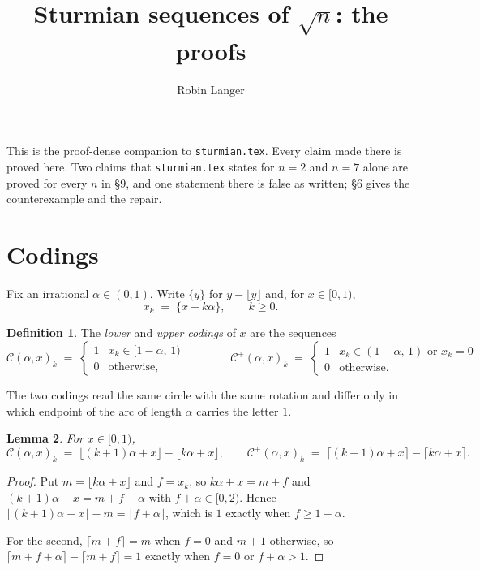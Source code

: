 \documentclass[11pt,a4paper]{article}
\title{Sturmian sequences of $\sqrt n$: the proofs}
\author{Robin Langer}
\date{}
\newcommand{\C}{\mathcal{C}}
\newcommand{\Cp}{\mathcal{C}^{+}}
\theoremstyle{definition}
\newtheorem{definition}{Definition}
\theoremstyle{plain}
\newtheorem{lemma}[definition]{Lemma}
\begin{document}
\maketitle
\vspace{-2em}

This is the proof-dense companion to \texttt{sturmian.tex}. Every claim made
there is proved here. Two claims that \texttt{sturmian.tex} states for
$n = 2$ and $n = 7$ alone are proved for every $n$ in \S9, and one statement
there is false as written; \S6 gives the counterexample and the repair.

\section{Codings}

Fix an irrational $\alpha \in (0,1)$. Write $\{y\}$ for $y - \lfloor y \rfloor$
and, for $x \in [0,1)$,
\[
  x_k \;=\; \{x + k\alpha\} , \qquad k \geq 0 .
\]

\begin{definition}
The \emph{lower} and \emph{upper codings} of $x$ are the sequences
\[
  \C(\alpha,x)_k \;=\;
  \begin{cases} 1 & x_k \in [1-\alpha,\,1) \\ 0 & \text{otherwise,}\end{cases}
  \qquad\qquad
  \Cp(\alpha,x)_k \;=\;
  \begin{cases} 1 & x_k \in (1-\alpha,\,1) \text{ or } x_k = 0 \\ 0 & \text{otherwise.}\end{cases}
\]
\end{definition}

The two codings read the same circle with the same rotation and differ only in
which endpoint of the arc of length $\alpha$ carries the letter $1$.

\begin{lemma}\label{lem:mech}
For $x \in [0,1)$,
\[
  \C(\alpha,x)_k \;=\; \lfloor (k+1)\alpha + x \rfloor - \lfloor k\alpha + x \rfloor ,
  \qquad
  \Cp(\alpha,x)_k \;=\; \lceil (k+1)\alpha + x \rceil - \lceil k\alpha + x \rceil .
\]
\end{lemma}

\begin{proof}
Put $m = \lfloor k\alpha + x\rfloor$ and $f = x_k$, so $k\alpha + x = m + f$ and
$(k+1)\alpha + x = m + f + \alpha$ with $f + \alpha \in [0,2)$. Hence
$\lfloor (k+1)\alpha+x\rfloor - m = \lfloor f + \alpha \rfloor$, which is $1$
exactly when $f \geq 1-\alpha$.

For the second, $\lceil m + f \rceil = m$ when $f = 0$ and $m+1$ otherwise, so
$\lceil m+f+\alpha\rceil - \lceil m+f\rceil = 1$ exactly when $f = 0$ or
$f + \alpha > 1$.
\end{proof}
\end{document}
